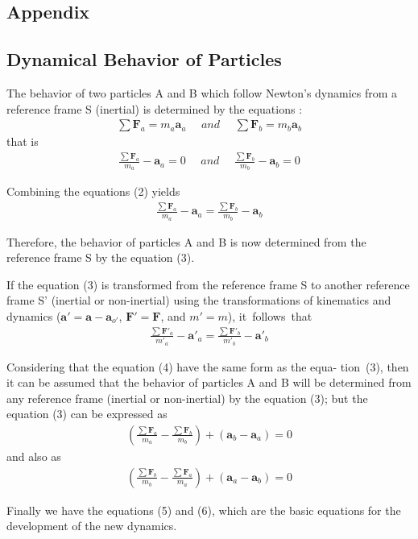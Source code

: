 \documentclass[11pt]{article}
\newcommand{\vA}{\mathbf{a}}
\newcommand{\vF}{\mathbf{F}}
\newcommand{\mM}{m}
\newcommand{\rt}{'}
\newcommand{\ra}{_a}
\newcommand{\rb}{_b}
\newcommand{\rot}{_{o'}}
\begin{document}
\newpage \baselineskip=12.78pt

{\centering\subsection*{Appendix}}

\vspace{-0.9mm}

{\centering\subsection*{Dynamical Behavior of Particles}}

\vspace{-0.9mm}

\par The behavior of two particles A and B which follow Newton's dynamics from a reference frame S (inertial) is determined by the equations \hspace{-0.12em}:
\begin{eqnarray}
\sum \vF\ra = \mM\ra\vA\ra \ \ \ \ \ \ and \ \ \ \ \ \ 
\sum \vF\rb = \mM\rb\vA\rb
\end{eqnarray}
\noindent that is
\begin{eqnarray}
\frac{\sum \vF\ra}{\mM\ra} - \vA\ra = 0 \ \ \ \ \ \ and \ \ \ \ \ \ 
\frac{\sum \vF\rb}{\mM\rb} - \vA\rb = 0
\end{eqnarray}
\par Combining the equations (2) yields
\begin{eqnarray}
\frac{\sum \vF\ra}{\mM\ra} - \vA\ra = \frac{\sum \vF\rb}{\mM\rb} - \vA\rb
\end{eqnarray}
\par Therefore, the behavior of particles A and B is now determined from the reference frame S by the equation (3).
\par If the equation (3) is transformed from the reference frame S to another reference frame S' (inertial or non-inertial) using the transformations of kinematics and dynamics ($\vA\rt = \vA - \vA\rot$, $\vF\rt = \vF$, and $\mM\rt = \mM$), \hbox {it follows that}
\begin{eqnarray}
\frac{\sum \vF\rt\ra}{\mM\rt\ra} - \vA\rt\ra = \frac{\sum \vF\rt\rb}{\mM\rt\rb} - \vA\rt\rb
\end{eqnarray}
\par Considering that the equation (4) have the same form as the equa- \hbox {tion (3)}, then it can be assumed that the behavior of particles A and B will be determined from any reference frame (inertial or non-inertial) by the equation (3); but the equation (3) can be expressed as
\begin{eqnarray}
(\frac{\sum \vF\ra}{\mM\ra} - \frac{\sum \vF\rb}{\mM\rb}) + (\vA\rb - \vA\ra) = 0
\end{eqnarray}
\noindent and also as
\begin{eqnarray}
(\frac{\sum \vF\rb}{\mM\rb} - \frac{\sum \vF\ra}{\mM\ra}) + (\vA\ra - \vA\rb) = 0
\end{eqnarray}
\par Finally we have the equations (5) and (6), which are the basic equations for the development of the new dynamics.
\end{document}
